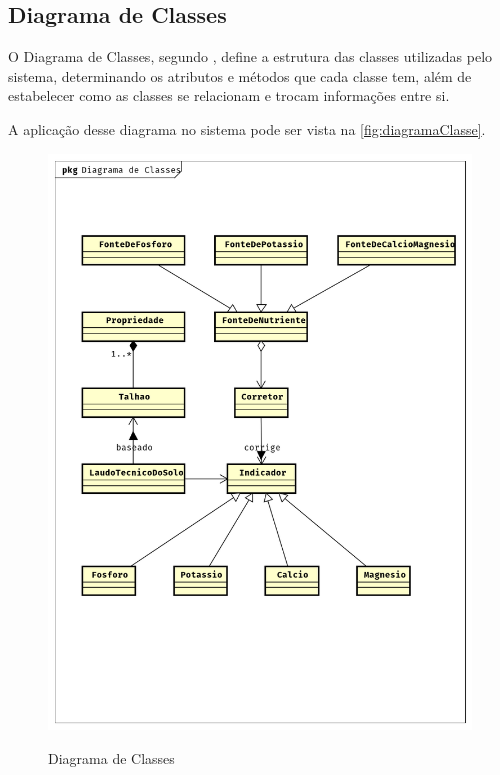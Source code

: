 \subsection{Diagrama de Classes}
\label{sec:titSecDiagClasse}

O Diagrama de Classes, segundo , define a estrutura das classes utilizadas pelo sistema, determinando os atributos e métodos que cada classe tem, além de estabelecer como as classes se relacionam e trocam informações entre si.

A aplicação desse diagrama no sistema pode ser vista na \autoref{fig:diagramaClasse}.

\begin{figure}[H]
    \centering
    \caption{Diagrama de Classes}
    \includegraphics[width=13cm]{./dados/analise/diagramaclasse.png}
    \label{fig:diagramaClasse}
\end{figure}